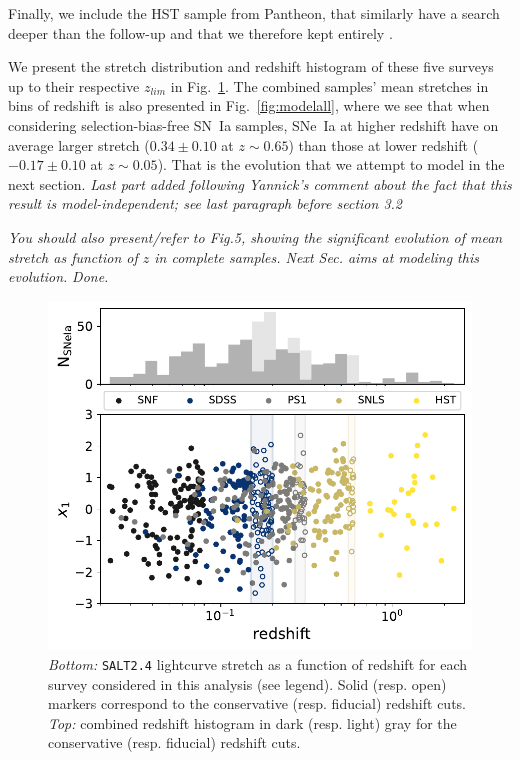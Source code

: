 \documentclass[]{aa} %
\newcommand{\nn}[1]{{\textcolor[rgb]{0.25, 0.50, 0}{#1}}}
\newcommand{\nnn}[1]{{\textcolor[rgb]{0.40, 0.0, 0.20}{#1}}}
\newcommand{\yc}[1]{{\textcolor{BrickRed}{#1}}}
\begin{document}
Finally, we include the HST sample from Pantheon, that similarly have a search
deeper than the follow-up and that we therefore kept entirely
\citep{strolger04}.

We present the stretch distribution and redshift histogram of these five surveys
up to their respective $z_{lim}$ in Fig.~\ref{fig:sample}. \nn{The combined
samples' mean stretches in bins of redshift is also presented
in Fig.~\ref{fig:modelall}, where we see that when considering
selection-bias-free SN~Ia samples, SNe~Ia at higher redshift have on average
larger stretch ($0.34 \pm 0.10$ at $z\sim0.65$) than those at lower redshift
($-0.17\pm 0.10$ at $z\sim0.05$). That is the evolution that we attempt to model
in the next section.} \nnn{\textit{Last part added following Yannick's comment
about the fact that this result is model-independent; see last paragraph before
section 3.2}}

\yc{\textit{You should also present/refer to Fig.5, showing the significant
evolution of mean stretch as function of $z$ in complete samples. Next Sec. aims
at modeling this evolution.}} \nn{\textit{Done.}}

\begin{figure}
    \centering
    \includegraphics[width=0.95\linewidth]{Article_figures/stretchs-cut_btw_hist_cumu_75-lb-cividis.pdf}
    \caption{\textit{Bottom:} \textsc{\texttt{SALT2.4}} lightcurve stretch as a
        function of redshift for each survey considered in this analysis (see
        legend). Solid (resp. open) markers correspond to the conservative
        (resp. fiducial) redshift cuts. \textit{Top:} combined redshift
    histogram in dark (resp. light) gray for the conservative (resp. fiducial)
redshift cuts.}
    \label{fig:sample}
\end{figure}
\end{document}
